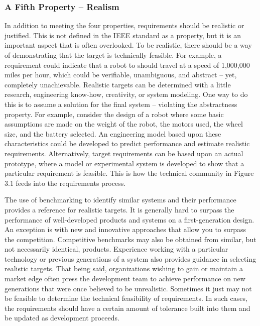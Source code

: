 \subsubsection{A Fifth Property --
Realism}\label{a-fifth-property-realism}

In addition to meeting the four properties, requirements should be
realistic or justified. This is not defined in the IEEE standard as a
property, but it is an important aspect that is often overlooked. To be
realistic, there should be a way of demonstrating that the target is
technically feasible. For example, a requirement could indicate that a
robot to should travel at a speed of 1,000,000 miles per hour, which
could be verifiable, unambiguous, and abstract -- yet, completely
unachievable. Realistic targets can be determined with a little
research, engineering know-how, creativity, or system modeling. One way
to do this is to assume a solution for the final system -- violating the
abstractness property. For example, consider the design of a robot where
some basic assumptions are made on the weight of the robot, the motors
used, the wheel size, and the battery selected. An engineering model
based upon these characteristics could be developed to predict
performance and estimate realistic requirements. Alternatively, target
requirements can be based upon an actual prototype, where a model or
experimental system is developed to show that a particular requirement
is feasible. This is how the technical community in Figure 3.1 feeds
into the requirements process.

The use of benchmarking to identify similar systems and their
performance provides a reference for realistic targets. It is generally
hard to surpass the performance of well-developed products and systems
on a first-generation design. An exception is with new and innovative
approaches that allow you to surpass the competition. Competitive
benchmarks may also be obtained from similar, but not necessarily
identical, products. Experience working with a particular technology or
previous generations of a system also provides guidance in selecting
realistic targets. That being said, organizations wishing to gain or
maintain a market edge often press the development team to achieve
performance on new generations that were once believed to be
unrealistic. Sometimes it just may not be feasible to determine the
technical feasibility of requirements. In such cases, the requirements
should have a certain amount of tolerance built into them and be updated
as development proceeds.

